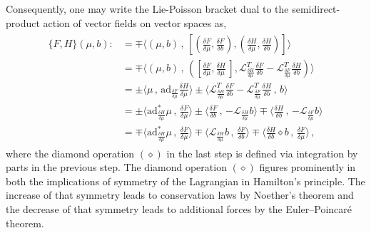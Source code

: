 \documentclass[11pt, oneside]{article}   	%
\numberwithin{equation}{section}
\theoremstyle{plain}
\theoremstyle{definition}
\theoremstyle{remark}
\newcommand{\<}{\langle}
\renewcommand{\>}{\rangle}
\newcommand{\scp}[2]{{\big\langle {#1}\, , \, {#2}\big\rangle}}
\begin{document}
Consequently, one may write the Lie-Poisson bracket dual to the semidirect-product 
action of vector fields on vector spaces as, \vspace{-5mm}
\begin{align}
\begin{split}
\Big\{ F,H \Big\}(\mu,b) :&= \mp\scp{(\mu,b)}{\left[\left(\frac{\delta F}{\delta \mu} , \frac{\delta F}{\delta b}\right), \left(\frac{\delta H}{\delta \mu},\frac{\delta H}{\delta b}\right)\right]}
\\&= \mp
\scp{(\mu,b)} { \left( \left[\frac{\delta F}{\delta \mu},\frac{\delta H}{\delta \mu}\,\right] ,
 \mathcal{L}^T_{\frac{\delta H}{\delta \mu}}\frac{\delta F}{\delta b} -  \mathcal{L}^T_{\frac{\delta F}{\delta \mu}}\frac{\delta H}{\delta b}\right) }
\\&= 
\pm\scp{\mu} {\mathrm{ad}_{\frac{\delta F}{\delta \mu}} \frac{\delta H}{\delta \mu} }
\pm\scp{ \mathcal{L}^T_{\frac{\delta H}{\delta \mu} }\frac{\delta F}{\delta b} -  \mathcal{L}^T_{\frac{\delta F}{\delta \mu}}\frac{\delta H}{\delta b}}{b}
\\&=
\pm\scp{\mathrm{ad}^*_{\frac{\delta H}{\delta \mu}}\mu} {\frac{\delta F}{\delta \mu}}
\pm \scp{\frac{\delta F}{\delta b}} {- \mathcal{L}_{\frac{\delta H}{\delta \mu} } b}
\mp \scp{\frac{\delta H}{\delta b}} {- \mathcal{L}_{\frac{\delta F}{\delta \mu}}b}
\\&=
\mp\scp{\mathrm{ad}^*_{\frac{\delta H}{\delta \mu}}\mu} {\frac{\delta F}{\delta \mu}}
\mp \scp { \mathcal{L}_{\frac{\delta H}{\delta \mu} } b} {\frac{\delta F}{\delta b}}
\mp \scp{\frac{\delta H}{\delta b}\diamond b} {\frac{\delta F}{\delta \mu} }
\,,\end{split}
\label{SDP-LPB}
\end{align}
where the diamond operation $(\diamond)$ in the last step is defined via integration by parts in the previous step.
The diamond operation $(\diamond)$ figures prominently in both the implications of symmetry of the Lagrangian 
in Hamilton's principle. The increase of that symmetry leads to conservation laws by Noether's theorem 
and the decrease of that symmetry leads to additional forces by the Euler--Poincar\'e theorem. 
\end{document}

